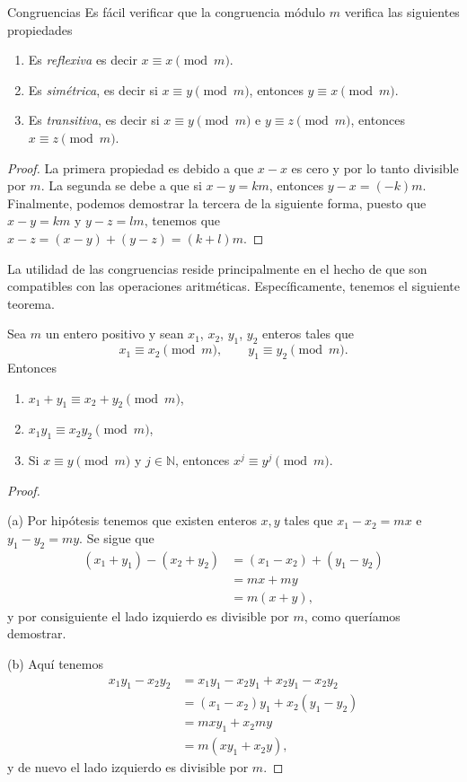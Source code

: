 \begin{section}{Congruencias}
Es fácil verificar que la {congruencia módulo} $m$ verifica las
siguientes propiedades
\begin{enumerate}[label=(\alph*)]
\item
Es {\it {reflexiva}} es decir $x\equiv x\pmod{m}$.
\item
Es {\it {simétrica}}, es decir si $x \equiv y \pmod{m}$, entonces
$y \equiv x \pmod{m}$.
\item
Es {\it { transitiva}}, es decir si $x\equiv y \pmod{m}$ e
$y\equiv z \pmod{m}$, entonces $x\equiv z \pmod{m}$.
\end{enumerate}
\begin{proof}
La primera propiedad es debido a que $x-x$ es cero y por lo tanto
divisible por $m$. La segunda se debe a que si $x-y=km$, entonces
$y-x=(-k)m$. Finalmente, podemos demostrar la tercera de la
siguiente forma, puesto que $x-y=km$ y $y-z=lm$, tenemos que
$x-z=(x-y)+(y-z)=(k+l)m$.
\end{proof}


La utilidad de las congruencias reside principalmente en el hecho
de que son compatibles con las operaciones aritméticas.
Específicamente, tenemos el siguiente teorema.

\begin{teorema}\label{t4.1} Sea $m$ un entero positivo y sean $x_1$, $x_2$,
$y_1$, $y_2$ enteros tales que
$$
x_1 \equiv x_2 \pmod{m}, \qquad y_1 \equiv y_2 \pmod{m}.
$$
Entonces
\begin{enumerate}[label=(\alph*)]
\item $ x_1+ y_1 \equiv x_2+ y_2 \pmod{m}$,
\item  $x_1 y_1 \equiv x_2 y_2 \pmod{m}$,
\item  Si $x \equiv y \pmod{m}$  y $j \in  \mathbb N$, entonces $x^j \equiv y^j \pmod{m}$.
\end{enumerate}
\end{teorema}
\begin{proof}
\

\noindent(a) Por hipótesis tenemos que existen enteros
$x,y$ tales que $x_1-x_2=mx$ e $y_1-y_2=my$. Se sigue que
$$
\begin{aligned}
(x_1+y_1)-(x_2+y_2) &= (x_1-x_2)+ (y_1 -y_2) \\
&= mx +my \\
&= m(x+y),
\end{aligned}
$$
y por consiguiente el lado izquierdo es divisible por $m$, como
queríamos demostrar.

\noindent (b)  Aquí tenemos
$$
\begin{aligned}
x_1y_1-x_2y_2 &=  x_1y_1-x_2y_1+ x_2y_1-x_2y_2 \\
&= (x_1-x_2)y_1+ x_2(y_1 -y_2) \\
&= mxy_1 +x_2my \\
&= m(xy_1+x_2y),
\end{aligned}
$$
y de nuevo el lado izquierdo es divisible por $m$.


\end{proof}
\end{section}
